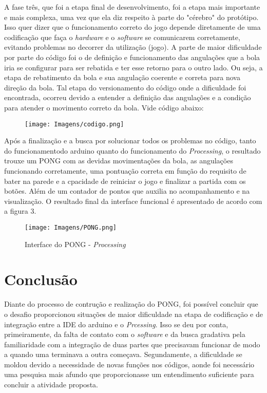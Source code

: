 \documentclass[11pt, a4paper, twocolumn]{article}
\begin{document}
    A fase três, que foi a etapa final de desenvolvimento, foi a etapa mais importante e mais complexa, uma vez que ela diz respeito à parte do "cérebro" do protótipo.
    Isso quer dizer que o funcionamento correto do jogo depende diretamente de uma codificação que faça o \textit{hardware} e o \textit{software} se comunicarem corretamente, 
    evitando problemas no decorrer da utilização (jogo). A parte de maior dificuldade por parte do código foi o de definição e funcionamento das angulações que a bola iria 
    se configurar para ser rebatida e ter esse retorno para o outro lado. Ou seja, a etapa de rebatimento da bola e sua angulação coerente e correta para nova direção da bola.
    Tal etapa do versionamento do código onde a dificuldade foi encontrada, ocorreu devido a entender a definição das angulações e a condição para atender o movimento correto da bola.
    Vide código abaixo:

        \begin{figure}[h]
            \centering
            \texttt{[image: Imagens/codigo.png]}
        \end{figure}

    Após a finalização e a busca por solucionar todos os problemas no código, tanto do funcionamentodo arduino quanto do funcionamento do \textit{Processing}, o resultado trouxe um PONG 
    com as devidas movimentações da bola, as angulações funcionando corretamente, uma pontuação correta em função do requisito de bater na parede e a cpacidade de reiniciar o jogo e finalizar 
    a partida com os botões. Além de um contador de pontos que auxilia no acompanhamento e na visualização. O resultado final da interface funcional é apresentado de acordo com a figura 3. 

        \begin{figure}[h]
            \caption{Interface do PONG - \textit{Processing}}
            \centering
            \texttt{[image: Imagens/PONG.png]}
        \end{figure}

\section{Conclusão}

Diante do processo de contrução e realização do PONG, foi possível concluir que o desafio proporcionou situações de maior dificuldade na etapa de codificação e de integração
entre a IDE do arduino e o \textit{Prcessing}. Isso se deu por conta, primeiramente, da falta de contato com o \textit{software} e da busca gradativa pela familiaridade com a 
integração de duas partes que precisavam funcionar de modo a quando uma terminava a outra começava. Segundamente, a dificuldade se moldou devido a necessidade de novas funções 
nos códigos, aonde foi necessário uma pesquisa mais afundo que proporcionasse um entendimento suficiente para concluir a atividade proposta.
\end{document}
